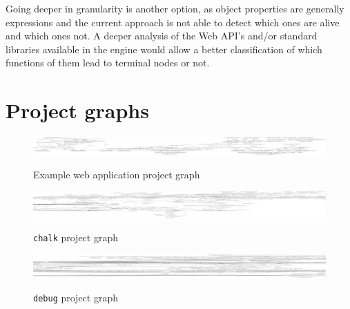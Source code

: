 \documentclass{uvamscse}
\begin{document}
Going deeper in granularity is another option, as object properties are generally expressions and the current approach is not able to detect which ones are alive and which ones not. A deeper analysis of the Web API's and/or standard libraries available in the engine would allow a better classification of which functions of them lead to terminal nodes or not.

\appendix
\chapter{Project graphs}
\begin{figure}[htbp]
  \centering
    \includegraphics[width=\textwidth]{dead-code_graph_project.pdf}
    \label{fig:deadcode}
   \caption{Example web application project graph}
\end{figure}
\begin{figure}[htbp]
    \centering
    \includegraphics[width=\textwidth]{chalk_graph_project.pdf}
    \label{fig:chalk}
\caption{\texttt{chalk} project graph}
\end{figure}
\begin{figure}[htbp]
    \centering
    \includegraphics[width=\textwidth]{debug_graph_project.pdf}
    \label{fig:debug}    
\caption{\texttt{debug} project graph}
\end{figure}

{


}
\end{document}
